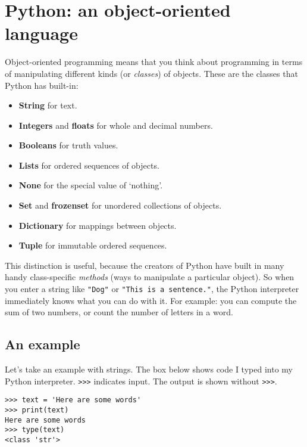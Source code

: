 \documentclass[12pt]{book}
\begin{document}
\section{Python: an object-oriented language}

Object-oriented programming means that you think about programming in terms of manipulating different kinds (or \emph{classes}) of objects. These are the classes that Python has built-in:

\begin{itemize}
\item \textbf{String} for text.
\item \textbf{Integers} and \textbf{floats} for whole and decimal numbers.
\item \textbf{Booleans} for truth values.
\item \textbf{Lists} for ordered sequences of objects.
\item \textbf{None} for the special value of `nothing'.
\item \textbf{Set} and \textbf{frozenset} for unordered collections of objects.
\item \textbf{Dictionary} for mappings between objects.
\item \textbf{Tuple} for immutable ordered sequences.
\end{itemize}

This distinction is useful, because the creators of Python have built in many handy
class-specific \emph{methods} (ways to manipulate a particular object).  So when you enter a string like \texttt{"Dog"} or \texttt{"This\ is\ a\ sentence."}, the Python interpreter immediately knows what you can do with it. For example: you can compute the sum of two numbers, or count the number of letters in a word.

\subsection*{An example}

Let's take an example with strings. The box below shows code I typed into my Python interpreter.
\texttt{\textgreater{}\textgreater{}\textgreater{}} indicates input. The output is shown without \texttt{\textgreater{}\textgreater{}\textgreater{}}.

\begin{lstlisting}
>>> text = 'Here are some words'
>>> print(text)
Here are some words
>>> type(text)
<class 'str'>
\end{lstlisting}
\end{document}
